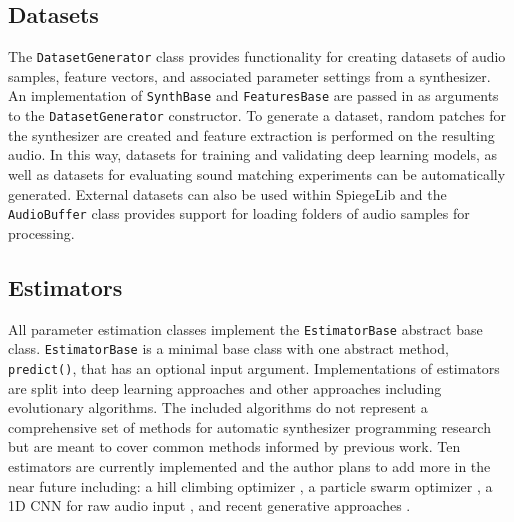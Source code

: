 \subsection{Datasets}
The \texttt{DatasetGenerator} class provides functionality for creating datasets of audio samples, feature vectors, and associated parameter settings from a synthesizer. An implementation of \texttt{SynthBase} and \texttt{FeaturesBase} are passed in as arguments to the \texttt{DatasetGenerator} constructor. To generate a dataset, random patches for the synthesizer are created and feature extraction is performed on the resulting audio. In this way, datasets for training and validating deep learning models, as well as datasets for evaluating sound matching experiments can be automatically generated. 
External datasets can also be used within SpiegeLib and the \texttt{AudioBuffer} class provides support for loading folders of audio samples for processing.

\subsection{Estimators}
All parameter estimation classes implement the \texttt{EstimatorBase} abstract base class. \texttt{EstimatorBase} is a minimal base class with one abstract method, \texttt{predict()}, that has an optional input argument. Implementations of estimators are split into deep learning approaches and other approaches including evolutionary algorithms.  The included algorithms do not represent a comprehensive set of methods for automatic synthesizer programming research but are meant to cover common methods informed by previous work. Ten estimators are currently implemented and the author plans to add more in the near future including: a hill climbing optimizer \cite{yee2018automatic}, a particle swarm optimizer \cite{heise2009automatic}, a 1D CNN for raw audio input \cite{barkan2019inversynth}, and recent generative approaches \cite{esling2020flow, le2021improving}.

